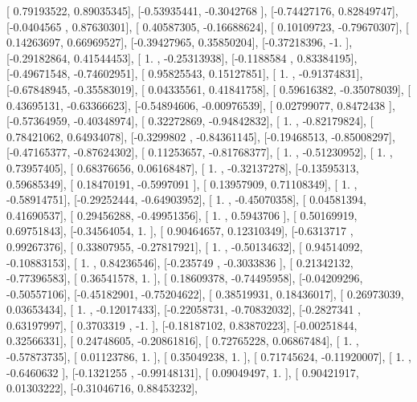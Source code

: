 \documentclass{article}
\begin{document}
       [ 0.79193522,  0.89035345],
       [-0.53935441, -0.3042768 ],
       [-0.74427176,  0.82849747],
       [-0.0404565 ,  0.87630301],
       [ 0.40587305, -0.16688624],
       [ 0.10109723, -0.79670307],
       [ 0.14263697,  0.66969527],
       [-0.39427965,  0.35850204],
       [-0.37218396, -1.        ],
       [-0.29182864,  0.41544453],
       [ 1.        , -0.25313938],
       [-0.1188584 ,  0.83384195],
       [-0.49671548, -0.74602951],
       [ 0.95825543,  0.15127851],
       [ 1.        , -0.91374831],
       [-0.67848945, -0.35583019],
       [ 0.04335561,  0.41841758],
       [ 0.59616382, -0.35078039],
       [ 0.43695131, -0.63366623],
       [-0.54894606, -0.00976539],
       [ 0.02799077,  0.8472438 ],
       [-0.57364959, -0.40348974],
       [ 0.32272869, -0.94842832],
       [ 1.        , -0.82179824],
       [ 0.78421062,  0.64934078],
       [-0.3299802 , -0.84361145],
       [-0.19468513, -0.85008297],
       [-0.47165377, -0.87624302],
       [ 0.11253657, -0.81768377],
       [ 1.        , -0.51230952],
       [ 1.        ,  0.73957405],
       [ 0.68376656,  0.06168487],
       [ 1.        , -0.32137278],
       [-0.13595313,  0.59685349],
       [ 0.18470191, -0.5997091 ],
       [ 0.13957909,  0.71108349],
       [ 1.        , -0.58914751],
       [-0.29252444, -0.64903952],
       [ 1.        , -0.45070358],
       [ 0.04581394,  0.41690537],
       [ 0.29456288, -0.49951356],
       [ 1.        ,  0.5943706 ],
       [ 0.50169919,  0.69751843],
       [-0.34564054,  1.        ],
       [ 0.90464657,  0.12310349],
       [-0.6313717 ,  0.99267376],
       [ 0.33807955, -0.27817921],
       [ 1.        , -0.50134632],
       [ 0.94514092, -0.10883153],
       [ 1.        ,  0.84236546],
       [-0.235749  , -0.3033836 ],
       [ 0.21342132, -0.77396583],
       [ 0.36541578,  1.        ],
       [ 0.18609378, -0.74495958],
       [-0.04209296, -0.50557106],
       [-0.45182901, -0.75204622],
       [ 0.38519931,  0.18436017],
       [ 0.26973039,  0.03653434],
       [ 1.        , -0.12017433],
       [-0.22058731, -0.70832032],
       [-0.2827341 ,  0.63197997],
       [ 0.3703319 , -1.        ],
       [-0.18187102,  0.83870223],
       [-0.00251844,  0.32566331],
       [ 0.24748605, -0.20861816],
       [ 0.72765228,  0.06867484],
       [ 1.        , -0.57873735],
       [ 0.01123786,  1.        ],
       [ 0.35049238,  1.        ],
       [ 0.71745624, -0.11920007],
       [ 1.        , -0.6460632 ],
       [-0.1321255 , -0.99148131],
       [ 0.09049497,  1.        ],
       [ 0.90421917,  0.01303222],
       [-0.31046716,  0.88453232],
\end{document}
